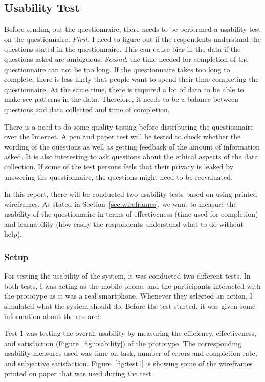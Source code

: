   \subsection{Usability Test}\label{sec:pretest}
  Before sending out the questionnaire, there needs to be performed a usability test on the questionnaire. {\it First}, I need to figure out if the respondents understand the questions stated in the questionnaire. This can cause bias in the data if the questions asked are ambiguous. {\it Second}, the time needed for completion of the questionnaire can not be too long. If the questionnaire takes too long to complete, there is less likely that people want to spend their time completing the questionnaire. At the same time, there is required a lot of data to be able to make see patterns in the data. Therefore, it needs to be a balance between questions and data collected and time of completion.

  There is a need to do some quality testing before distributing the questionnaire over the Internet. A pen and paper test will be tested to check whether the wording of the questions as well as getting feedback of the amount of information asked. It is also interesting to ask questions about the ethical aspects of the data collection. If some of the test persons feels that their privacy is leaked by answering the questionnaire, the questions might need to be reevaluated.

  In this report, there will be conducted two usability tests based on using printed wireframes. As stated in Section~\ref{sec:wireframes}, we want to measure the usability of the questionnaire in terms of effectiveness (time used for completion) and learnability (how easily the respondents understand what to do without help).

  \subsubsection*{Setup}

  For testing the usability of the system, it was conducted two different tests. In both tests, I was acting as the mobile phone, and the participants interacted with the prototype as it was a real smartphone. Whenever they selected an action, I simulated what the system should do.
  Before the test started, it was given some information about the research.  
  
  Test 1 was testing the overall usability by measuring the efficiency, effectiveness, and satisfaction (Figure~\ref{fig:usability}) of the prototype. The corresponding usability measures used was time on task, number of errors and completion rate, and subjective satisfaction. Figure~\ref{fig:test1} is showing some of the wireframes printed on paper that was used during the test. 

